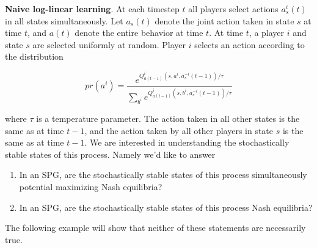 {\bf Naive log-linear learning}. At each timestep $t$ all players select actions $a^i_s(t)$ in all states simultaneously. Let $a_s(t)$ denote the joint action taken in state $s$ at time $t$, and $a(t)$ denote the entire behavior at time $t$. At time $t$, a player $i$ and state $s$ are selected uniformly at random. Player $i$ selects an action according to the distribution

$$
pr(a^i) = \dfrac{e^{Q^i_{a(t-1)}(s, a^i, a^{-i}_s(t-1))/\tau}}{\sum_{b^i}e^{Q^i_{a(t-1)}(s, b^i, a^{-i}_s(t-1))/\tau}}
$$

where $\tau$ is a temperature parameter. The action taken in all other states is the same as at time $t-1$, and the action taken by all other players in state $s$ is the same as at time $t-1$. We are interested in understanding the stochastically stable states of this process. Namely we'd like to answer

\begin{enumerate}
\item In an SPG, are the stochastically stable states of this process simultaneously potential maximizing Nash equilibria?
\item In an SPG, are the stochastically stable states of this process Nash equilibria?
\end{enumerate}

The following example will show that neither of these statements are necessarily true.



